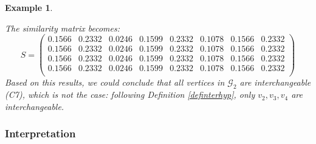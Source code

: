 \documentclass[a4paper,11pt]{report}
\newtheorem{example}[theorem]{Example}
\newcommand{\hgraf}{\mathcal{G}}
\begin{document}
\begin{example}
\begin{center}
\begin{tikzpicture}
\end{tikzpicture}
\end{center}
The similarity matrix becomes:
$$S = \begin{pmatrix}
0.1566&0.2332&0.0246&0.1599&0.2332&0.1078&0.1566&0.2332\\
0.1566&0.2332&0.0246&0.1599&0.2332&0.1078&0.1566&0.2332\\
0.1566&0.2332&0.0246&0.1599&0.2332&0.1078&0.1566&0.2332\\
0.1566&0.2332&0.0246&0.1599&0.2332&0.1078&0.1566&0.2332\\
\end{pmatrix}$$
Based on this results, we could conclude that all vertices in $\hgraf_2$ are 
interchangeable (C7), which is not the case: following Definition \ref{definterhyp}, 
only $v_2, v_3, v_4$ are interchangeable.
\end{example}


\subsubsection{Interpretation}
\end{document}
